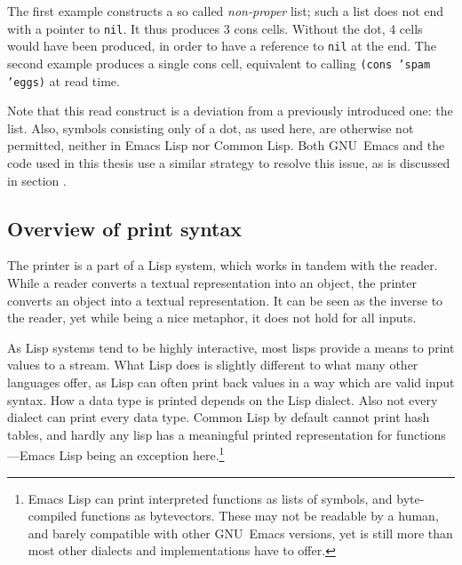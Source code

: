 \documentclass[a4paper,10pt,twoside]{article}
\newcommand{\el}{Emacs Lisp}
\newcommand{\cl}{Common Lisp}
\newcommand{\sym}[1]{\texttt{#1}}
\newcommand{\emacs}{GNU~Emacs}
\newcommand{\nil}{\sym{nil}}
\begin{document}
The first example constructs a so called \emph{non-proper} list; such a list
does not end with a pointer to \nil{}.  It thus produces 3 cons cells.  Without
the dot, 4 cells would have been produced, in order to have a reference to
\nil{} at the end.  The second example produces a single cons cell, equivalent
to calling \texttt{(cons 'spam 'eggs)} at read time.

Note that this read construct is a deviation from a previously introduced one:
the list.  Also, symbols consisting only of a dot, as used here, are otherwise
not permitted, neither in \el{} nor \cl{}.  Both \emacs{} and the code used in
this thesis use a similar strategy to resolve this issue, as is discussed in
section .


\subsection{Overview of print syntax}
\label{subsec:print-syntax}

The printer is a part of a Lisp system, which works in tandem with the reader.
While a reader converts a textual representation into an object, the printer
converts an object into a textual representation.  It can be seen as the inverse
to the reader, yet while being a nice metaphor, it does not hold for all inputs.

As Lisp systems tend to be highly interactive, most lisps provide a means to
print values to a stream.  What Lisp does is slightly different to what many
other languages offer, as Lisp can often print back values in a way which are
valid input syntax.  How a data type is printed depends on the Lisp dialect.
Also not every dialect can print every data type.  Common Lisp by default cannot
print hash tables, and hardly any lisp has a meaningful printed representation
for functions---\el{} being an exception here.\footnote{\el{} can print
  interpreted functions as lists of symbols, and byte-compiled functions as
  bytevectors.  These may not be readable by a human, and barely compatible with
  other \emacs{} versions, yet is still more than most other dialects and
  implementations have to offer.}
\end{document}
